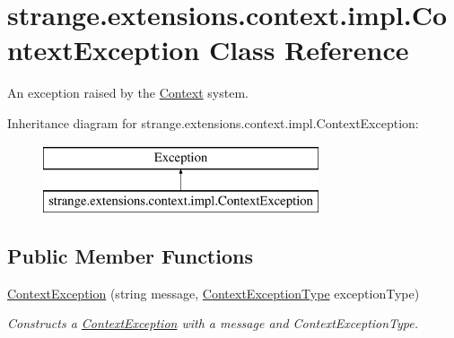 \hypertarget{classstrange_1_1extensions_1_1context_1_1impl_1_1_context_exception}{\section{strange.\-extensions.\-context.\-impl.\-Context\-Exception Class Reference}
\label{classstrange_1_1extensions_1_1context_1_1impl_1_1_context_exception}
}


An exception raised by the \hyperlink{classstrange_1_1extensions_1_1context_1_1impl_1_1_context}{Context} system.  


Inheritance diagram for strange.\-extensions.\-context.\-impl.\-Context\-Exception\-:\begin{figure}[H]
\begin{center}
\leavevmode
\includegraphics[height=2.000000cm]{classstrange_1_1extensions_1_1context_1_1impl_1_1_context_exception}
\end{center}
\end{figure}
\subsection*{Public Member Functions}
\begin{DoxyCompactItemize}
\item 
\hypertarget{classstrange_1_1extensions_1_1context_1_1impl_1_1_context_exception_afbbfbf40057f590e27448b255d056561}{\hyperlink{classstrange_1_1extensions_1_1context_1_1impl_1_1_context_exception_afbbfbf40057f590e27448b255d056561}{Context\-Exception} (string message, \hyperlink{namespacestrange_1_1extensions_1_1context_1_1api_a60b937d6295cc72fe4b26e4f9d671283}{Context\-Exception\-Type} exception\-Type)}\label{classstrange_1_1extensions_1_1context_1_1impl_1_1_context_exception_afbbfbf40057f590e27448b255d056561}

\begin{DoxyCompactList}\small\item\em Constructs a \hyperlink{classstrange_1_1extensions_1_1context_1_1impl_1_1_context_exception}{Context\-Exception} with a message and Context\-Exception\-Type. \end{DoxyCompactList}\end{DoxyCompactItemize}
